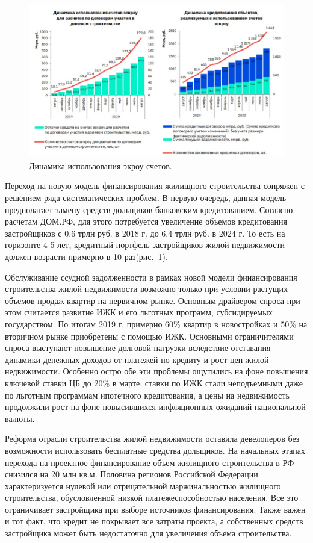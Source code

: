 \documentclass[12pt,a4paper]{article} %
\begin{document}
\begin{figure}[h]
	
	\centering
	
	\includegraphics[width=0.7\linewidth]{eskrou_dynam.jpg}
	
	\caption{Динамика использования экроу счетов.}
	
	\label{fig:eskrou_dynam}
	
\end{figure}

Переход на новую модель финансирования жилищного строительства сопряжен с решением ряда систематических проблем. В первую очередь, данная модель предполагает замену средств дольщиков банковским кредитованием. Согласно расчетам ДОМ.РФ, для этого потребуется увеличение объемов кредитования застройщиков с 0,6 трлн руб. в 2018 г. до 6,4 трлн руб. в 2024 г. То есть на горизонте 4-5 лет, кредитный портфель застройщиков жилой недвижимости должен возрасти примерно в 10 раз(рис.~\ref{fig:eskrou_dynam}).

Обслуживание ссудной задолженности в рамках новой модели финансирования строительства жилой недвижимости возможно только при условии растущих объемов продаж квартир на первичном рынке. Основным драйвером спроса при этом считается развитие ИЖК и его льготных программ, субсидируемых государством. По итогам 2019 г. примерно 60\% квартир в новостройках и 50\% на вторичном рынке приобретены с помощью ИЖК.
Основными ограничителями спроса выступают повышение долговой нагрузки вследствие отставания динамики денежных доходов от платежей по кредиту и рост цен жилой недвижимости. Особенно остро обе эти проблемы ощутились на фоне повышения ключевой ставки ЦБ до 20\% в марте, ставки по ИЖК стали неподъемными даже по льготным программам ипотечного кредитования, а цены на недвижимость продолжили рост на фоне повысившихся инфляционных ожиданий национальной валюты.

Реформа отрасли строительства жилой недвижимости оставила девелоперов без возможности использовать бесплатные средства дольщиков. На начальных этапах перехода на проектное финансирование объем жилищного строительства в РФ снизился на 20 млн кв.м. Половина регионов Российской Федерации характеризуется нулевой или отрицательной маржинальностью жилищного строительства, обусловленной низкой платежеспособностью населения. Все это ограничивает застройщика при выборе источников финансирования. Также важен и тот факт, что кредит не покрывает все затраты проекта, а собственных средств застройщика может быть недостаточно для увеличения объема строительства. 
\end{document}
